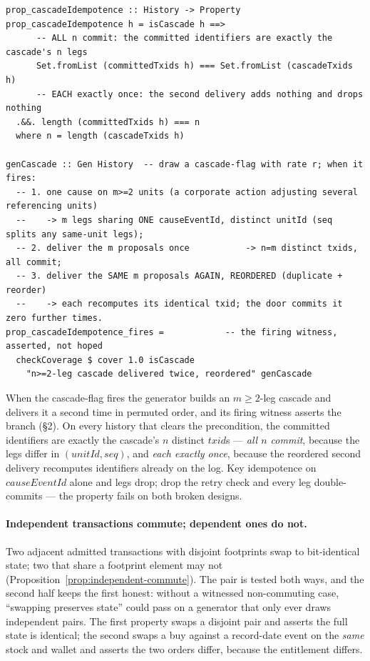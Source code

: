 \documentclass[11pt,a4paper]{article}
\begin{document}
\begin{lstlisting}
prop_cascadeIdempotence :: History -> Property
prop_cascadeIdempotence h = isCascade h ==>
      -- ALL n commit: the committed identifiers are exactly the cascade's n legs
      Set.fromList (committedTxids h) === Set.fromList (cascadeTxids h)
      -- EACH exactly once: the second delivery adds nothing and drops nothing
  .&&. length (committedTxids h) === n
  where n = length (cascadeTxids h)

genCascade :: Gen History  -- draw a cascade-flag with rate r; when it fires:
  -- 1. one cause on m>=2 units (a corporate action adjusting several referencing units)
  --    -> m legs sharing ONE causeEventId, distinct unitId (seq splits any same-unit legs);
  -- 2. deliver the m proposals once           -> n=m distinct txids, all commit;
  -- 3. deliver the SAME m proposals AGAIN, REORDERED (duplicate + reorder)
  --    -> each recomputes its identical txid; the door commits it zero further times.
prop_cascadeIdempotence_fires =            -- the firing witness, asserted, not hoped
  checkCoverage $ cover 1.0 isCascade
    "n>=2-leg cascade delivered twice, reordered" genCascade
\end{lstlisting}

When the cascade-flag fires the generator builds an $m\ge 2$-leg cascade and delivers
it a second time in permuted order, and its firing witness asserts the branch (\S 2). On
every history that clears the
precondition, the committed identifiers are exactly the cascade's $n$ distinct
$\mathit{txid}$s --- \emph{all $n$ commit}, because the legs differ in
$(\mathit{unitId},\mathit{seq})$, and \emph{each exactly once}, because the reordered
second delivery recomputes identifiers already on the log. Key idempotence on
$\mathit{causeEventId}$ alone and legs drop; drop the retry check and every leg
double-commits --- the property fails on both broken designs.

\paragraph{Independent transactions commute; dependent ones do not.}
Two adjacent admitted transactions with disjoint footprints swap to bit-identical state;
two that share a footprint element may not (Proposition~\ref{prop:independent-commute}).
The pair is tested both ways, and the second half keeps the first honest: without a
witnessed non-commuting case, ``swapping preserves state'' could pass on a generator that
only ever draws independent pairs. The first property swaps a disjoint pair and asserts the
full state is identical; the second swaps a buy against a record-date event on the
\emph{same} stock and wallet and asserts the two orders differ, because the entitlement
differs.
\end{document}
